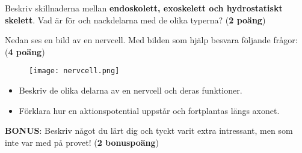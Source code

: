 \documentclass{exam}
\begin{document}
\begin{questions}
\vspace{60mm}
\question
Beskriv skillnaderna mellan \textbf{endoskolett, exoskelett och hydrostatiskt skelett}. Vad är för och nackdelarna med de olika typerna? (\textbf{2 poäng})
\vspace{60mm}

\break

\question Nedan ses en bild av en nervcell. Med bilden som hjälp besvara följande frågor: (\textbf{4 poäng})
\begin{figure}[h]
\centering
\texttt{[image: nervcell.png]}
\end{figure}

\begin{itemize}
    \item Beskriv de olika delarna av en nervcell och deras funktioner.
    \item Förklara hur en aktionspotential uppstår och fortplantas längs axonet.
\end{itemize}
\vspace{80mm}

\question \textbf{BONUS}: Beskriv något du lärt dig och tyckt varit extra intressant, men som inte var med på provet! (\textbf{2 bonuspoäng})

\end{questions}
\end{document}
